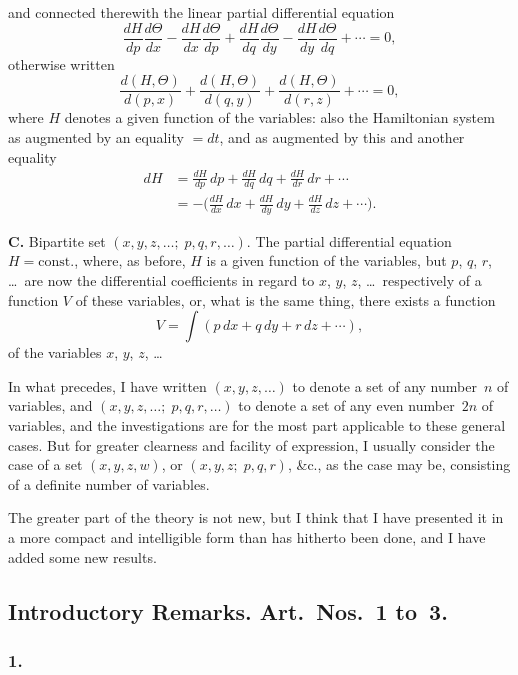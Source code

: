 \documentclass[11pt,a4paper]{book}
\begin{document}
\newpage
\setcounter{page}{114}

and connected therewith the linear partial differential equation
\[
\frac{dH}{dp}\frac{d\Theta}{dx} - \frac{dH}{dx}\frac{d\Theta}{dp} + \frac{dH}{dq}\frac{d\Theta}{dy} - \frac{dH}{dy}\frac{d\Theta}{dq} + \cdots = 0,
\]
otherwise written
\[
\frac{d(H, \Theta)}{d(p, x)} + \frac{d(H, \Theta)}{d(q, y)} + \frac{d(H, \Theta)}{d(r, z)} + \cdots = 0,
\]
where $H$ denotes a given function of the variables: also the Hamiltonian system as augmented by an equality $= dt$, and as augmented by this and another equality
\begin{align*}
dH &= \frac{dH}{dp}\,dp + \frac{dH}{dq}\,dq + \frac{dH}{dr}\,dr + \cdots \\
&= -\biggl(\frac{dH}{dx}\,dx + \frac{dH}{dy}\,dy + \frac{dH}{dz}\,dz + \cdots\biggr).
\end{align*}

\textbf{C.} Bipartite set $(x, y, z, \ldots;\; p, q, r, \ldots)$. The partial differential equation $H = \text{const.}$, where, as before, $H$ is a given function of the variables, but $p$, $q$, $r$, \ldots\ are now the differential coefficients in regard to $x$, $y$, $z$, \ldots\ respectively of a function $V$ of these variables, or, what is the same thing, there exists a function
\[
V = \int(p\,dx + q\,dy + r\,dz + \cdots),
\]
of the variables $x$, $y$, $z$, \ldots

In what precedes, I have written $(x, y, z, \ldots)$ to denote a set of any number~$n$ of variables, and $(x, y, z, \ldots;\; p, q, r, \ldots)$ to denote a set of any even number~$2n$ of variables, and the investigations are for the most part applicable to these general cases. But for greater clearness and facility of expression, I usually consider the case of a set $(x, y, z, w)$, or $(x, y, z;\; p, q, r)$, \&c., as the case may be, consisting of a definite number of variables.

The greater part of the theory is not new, but I think that I have presented it in a more compact and intelligible form than has hitherto been done, and I have added some new results.

\subsection*{Introductory Remarks. Art.~Nos.~1 to~3.}

\subsubsection*{1.}
\end{document}
